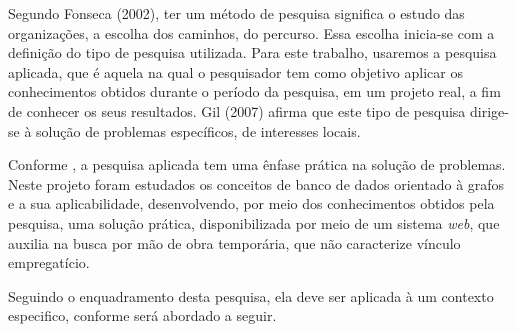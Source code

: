 \par Segundo Fonseca (2002), ter um método de pesquisa significa o estudo das organizações, a escolha dos caminhos, do percurso. Essa escolha inicia-se com a definição do tipo de pesquisa utilizada. Para este trabalho, usaremos a pesquisa aplicada, que é aquela na qual o pesquisador tem como objetivo aplicar os conhecimentos obtidos durante o período da pesquisa, em um projeto real, a fim de conhecer os seus resultados. Gil (2007) afirma que este tipo de pesquisa dirige-se à solução de problemas específicos, de interesses locais.

\par Conforme , a pesquisa aplicada tem uma ênfase prática na solução de problemas. Neste projeto foram estudados os conceitos de banco de dados orientado à grafos e a sua aplicabilidade, desenvolvendo, por meio dos conhecimentos obtidos pela pesquisa, uma solução prática, disponibilizada por meio de um sistema \textit{web}, que auxilia na busca por mão de obra temporária, que não caracterize vínculo empregatício.

\par Seguindo o enquadramento desta pesquisa, ela deve ser aplicada à um contexto especifico, conforme será abordado a seguir. 




